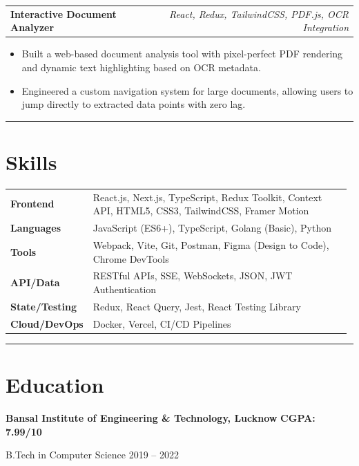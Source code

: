 \documentclass[9pt,a4paper]{article}
\begin{document}
\vspace{2pt}

\begin{tabular*}{\linewidth}{l@{\extracolsep{\fill}}r}
\textbf{Interactive Document Analyzer} & \textit{React, Redux, TailwindCSS, PDF.js, OCR Integration}
\end{tabular*}

\begin{itemize}
\item Built a web-based document analysis tool with pixel-perfect PDF rendering and dynamic text highlighting based on OCR metadata.
\item Engineered a custom navigation system for large documents, allowing users to jump directly to extracted data points with zero lag.
\end{itemize}

\vspace{3pt}
{\color{myblue}\hrule}

\section*{Skills}

\begin{tabular}{p{0.16\linewidth} p{0.82\linewidth}}
\textbf{Frontend}        & React.js, Next.js, TypeScript, Redux Toolkit, Context API, HTML5, CSS3, TailwindCSS, Framer Motion \\
\textbf{Languages}       & JavaScript (ES6+), TypeScript, Golang (Basic), Python \\
\textbf{Tools}           & Webpack, Vite, Git, Postman, Figma (Design to Code), Chrome DevTools \\
\textbf{API/Data}        & RESTful APIs, SSE, WebSockets, JSON, JWT Authentication \\
\textbf{State/Testing}   & Redux, React Query, Jest, React Testing Library \\
\textbf{Cloud/DevOps}    & Docker, Vercel, CI/CD Pipelines \\
\end{tabular}

\vspace{3pt}
{\color{myblue}\hrule}

\section*{Education}
\textbf{Bansal Institute of Engineering \& Technology, Lucknow} \hfill \textbf{CGPA: 7.99/10}

B.Tech in Computer Science \hfill 2019 -- 2022
\end{document}
